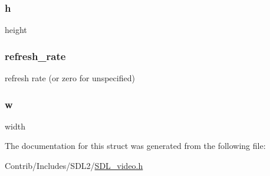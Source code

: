 \subsubsection[{\texorpdfstring{h}{h}}]{ h}\hypertarget{struct_s_d_l___display_mode_a16611451551e3d15916bae723c3f59f7}{}\label{struct_s_d_l___display_mode_a16611451551e3d15916bae723c3f59f7}
height 
\subsubsection[{\texorpdfstring{refresh\+\_\+rate}{refresh_rate}}]{ refresh\+\_\+rate}\hypertarget{struct_s_d_l___display_mode_a1885d5e794c0f216ec6dfdeb5933e4b5}{}\label{struct_s_d_l___display_mode_a1885d5e794c0f216ec6dfdeb5933e4b5}
refresh rate (or zero for unspecified) 
\subsubsection[{\texorpdfstring{w}{w}}]{ w}\hypertarget{struct_s_d_l___display_mode_aac374e320caaadeca4874add33b62af2}{}\label{struct_s_d_l___display_mode_aac374e320caaadeca4874add33b62af2}
width 

The documentation for this struct was generated from the following file\+:\begin{DoxyCompactItemize}
\item 
Contrib/\+Includes/\+S\+D\+L2/\hyperlink{_s_d_l__video_8h}{S\+D\+L\+\_\+video.\+h}\end{DoxyCompactItemize}

